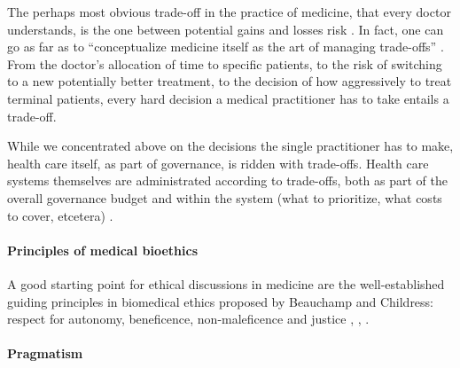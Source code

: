     The perhaps most obvious trade-off in the practice of medicine, that every doctor understands, is the one between potential gains and losses risk \cite{Launer2020}.
    In fact, one can go as far as to ``conceptualize medicine itself as the art of managing trade-offs'' \cite{Launer2020}.
    From the doctor's allocation of time to specific patients, to the risk of switching to a new potentially better treatment, to the decision of how aggressively to treat terminal patients, every hard decision a medical practitioner has to take entails a trade-off.

    While we concentrated above on the decisions the single practitioner has to make, health care itself, as part of governance, is ridden with trade-offs.
    Health care systems themselves are administrated according to trade-offs, both as part of the overall governance budget and within the system (what to prioritize, what costs to cover, etcetera) \cite{Dionne2018}. 
    \paragraph{Principles of medical bioethics}
    A good starting point for ethical discussions in medicine are the well-established guiding principles in biomedical ethics proposed by Beauchamp and Childress: respect for autonomy, beneficence, non-maleficence and justice \cite[pp.~344-345]{Dijkstra2020}, \cite[p.~2]{Morley2020}, \cite[p.~2]{Rajkomar2018}.


    \paragraph{Pragmatism}

